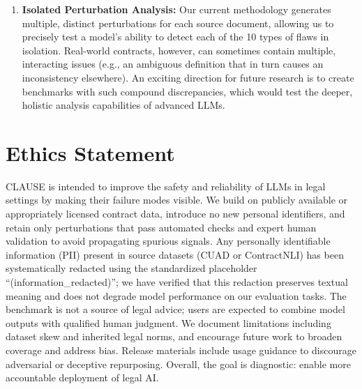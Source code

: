 \documentclass[11pt]{article}
\newcommand{\datasetName}{{\sc CLAUSE}\xspace}
\begin{document}
\begin{enumerate}[leftmargin=*,itemsep=0.1em]
    \item \textbf{Isolated Perturbation Analysis:} Our current methodology generates multiple, distinct perturbations for each source document, allowing us to precisely test a model's ability to detect each of the 10 types of flaws in isolation. Real-world contracts, however, can sometimes contain multiple, interacting issues (e.g., an ambiguous definition that in turn causes an inconsistency elsewhere). An exciting direction for future research is to create benchmarks with such compound discrepancies, which would test the deeper, holistic analysis capabilities of advanced LLMs.
\end{enumerate}

\section*{Ethics Statement}

\datasetName is intended to improve the safety and reliability of LLMs in legal settings by making their failure modes visible. We build on publicly available or appropriately licensed contract data, introduce no new personal identifiers, and retain only perturbations that pass automated checks and expert human validation to avoid propagating spurious signals. Any personally identifiable information (PII) present in source datasets (CUAD or ContractNLI) has been systematically redacted using the standardized placeholder ``(information\_redacted)''; we have verified that this redaction preserves textual meaning and does not degrade model performance on our evaluation tasks. The benchmark is not a source of legal advice; users are expected to combine model outputs with qualified human judgment. We document limitations including dataset skew and inherited legal norms, and encourage future work to broaden coverage and address bias. Release materials include usage guidance to discourage adversarial or deceptive repurposing. Overall, the goal is diagnostic: enable more accountable deployment of legal AI.
\end{document}
